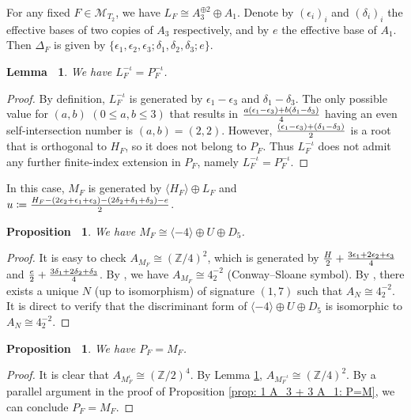 \documentclass[12pt,reqno,a4paper]{amsart}
\newtheorem{lem}[thm]{Lemma~}
\newtheorem{prop}[thm]{Proposition~}
\theoremstyle{remark}
\theoremstyle{definition}
\newcommand{\ZZ}{\mathbb{Z}}
\newcommand{\calM}{\mathcal{M}}
\begin{document}
For any fixed $F\in\calM_{T_2}$, we have $L_F\cong A_3^{\oplus 2}\oplus A_1$.
Denote by $(\epsilon_i)_i$ and $(\delta_i)_i$ the effective bases of two copies of $A_3$ respectively, and by $e$ the effective base of $A_1$.
Then $\Delta_F$ is given by $\{ \epsilon_1,\epsilon_2,\epsilon_3;\delta_1,\delta_2,\delta_3;e \}$.
\begin{lem}
\label{lem: 2 A_3 + 1 A_1: L^-iota = P^-iota}
    We have $L_F^{-\iota}=P_F^{-\iota}$.
\end{lem}
\begin{proof}
    By definition, $L_F^{-\iota}$ is generated by $\epsilon_1-\epsilon_3$ and $\delta_1-\delta_3$.
    The only possible value for $(a,b)$ $(0\le a,b\le 3)$ that results in $a(\epsilon_1-\epsilon_3)+b(\delta_1-\delta_3)\over4$ having an even self-intersection number is $(a,b)=(2,2)$.
    However, $(\epsilon_1-\epsilon_3)+(\delta_1-\delta_3)\over2$ is a root that is orthogonal to $H_F$, so it does not belong to $P_F$. 
    Thus $L_F^{-\iota}$ does not admit any further finite-index extension in $P_F$, namely $L_F^{-\iota} = P_F^{-\iota}$.
\end{proof}
In this case, $M_F$ is generated by $\langle H_F\rangle\oplus L_F$ and $u\coloneqq {H_F-(2\epsilon_2+\epsilon_1+\epsilon_3)-(2\delta_2+\delta_1+\delta_3)-e\over2}$.
\begin{prop}
    We have $M_F \cong \langle -4 \rangle\oplus U\oplus D_5$.
\end{prop}
\begin{proof}
    It is easy to check $A_{M_F}\cong(\ZZ/4)^2$, which is generated by ${H\over2}+{3\epsilon_1+2\epsilon_2+\epsilon_3\over4}$ and ${e\over2}+{3\delta_1+2\delta_2+\delta_3\over4}$.
    By \cite[Chapter 15, \S 7.4]{conway1999sphere}, we have $A_{M_F}\cong 4^{-2}_{2}$ (Conway--Sloane symbol).
    By \cite[Cor 1.13.3]{nikulin1979integer}, there exists a unique $N$ (up to isomorphism) of signature $(1,7)$ such that $A_N\cong 4^{-2}_{2}$.
    It is direct to verify that the discriminant form of $\langle -4 \rangle\oplus U\oplus D_5$ is isomorphic to $A_N\cong 4^{-2}_{2}$.
\end{proof}
\begin{prop}
    We have $P_F=M_F$. 
\end{prop}
\begin{proof}
    It is clear that $A_{M_F^\iota}\cong(\ZZ/2)^4$. 
    By Lemma \ref{lem: 2 A_3 + 1 A_1: L^-iota = P^-iota}, $A_{M_F^{-\iota}}\cong(\ZZ/4)^2$.
    By a parallel argument in the proof of Proposition \ref{prop: 1 A_3 + 3 A_1: P=M}, we can conclude $P_F=M_F$.
\end{proof}
\end{document}
